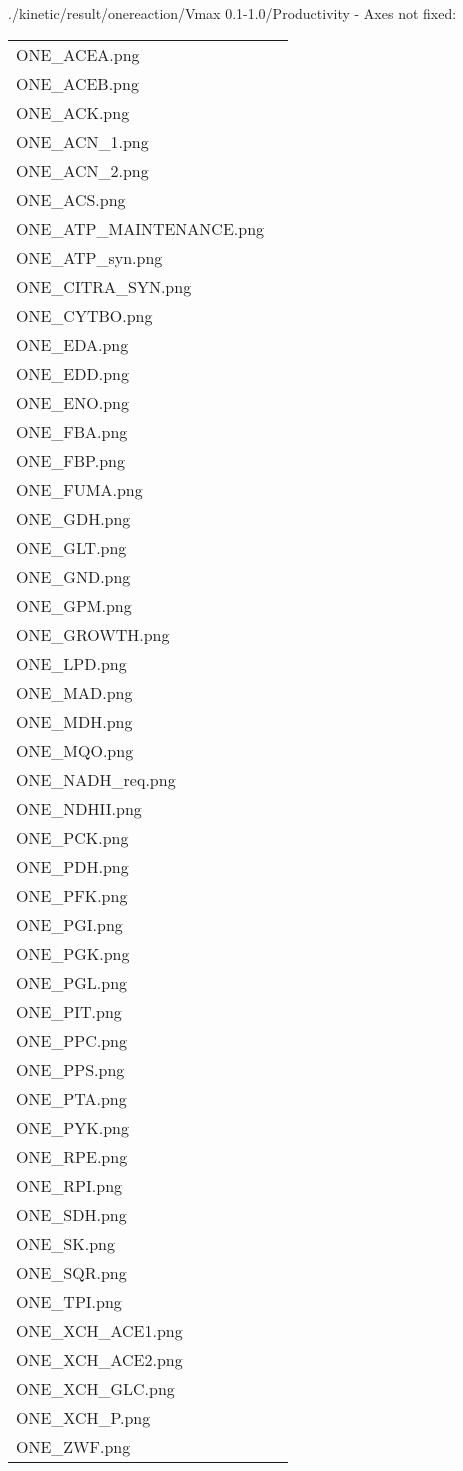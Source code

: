 \documentclass[a4paper, parskip=full]{scrreprt}
\begin{document}
./kinetic/result/onereaction/Vmax 0.1-1.0/Productivity - Axes not fixed:

\begin{longtable}{ll}
ONE\_ACEA.png\\
ONE\_ACEB.png\\
ONE\_ACK.png\\
ONE\_ACN\_1.png\\
ONE\_ACN\_2.png\\
ONE\_ACS.png\\
ONE\_ATP\_MAINTENANCE.png\\
ONE\_ATP\_syn.png\\
ONE\_CITRA\_SYN.png\\
ONE\_CYTBO.png\\
ONE\_EDA.png\\
ONE\_EDD.png\\
ONE\_ENO.png\\
ONE\_FBA.png\\
ONE\_FBP.png\\
ONE\_FUMA.png\\
ONE\_GDH.png\\
ONE\_GLT.png\\
ONE\_GND.png\\
ONE\_GPM.png\\
ONE\_GROWTH.png\\
ONE\_LPD.png\\
ONE\_MAD.png\\
ONE\_MDH.png\\
ONE\_MQO.png\\
ONE\_NADH\_req.png\\
ONE\_NDHII.png\\
ONE\_PCK.png\\
ONE\_PDH.png\\
ONE\_PFK.png\\
ONE\_PGI.png\\
ONE\_PGK.png\\
ONE\_PGL.png\\
ONE\_PIT.png\\
ONE\_PPC.png\\
ONE\_PPS.png\\
ONE\_PTA.png\\
ONE\_PYK.png\\
ONE\_RPE.png\\
ONE\_RPI.png\\
ONE\_SDH.png\\
ONE\_SK.png\\
ONE\_SQR.png\\
ONE\_TPI.png\\
ONE\_XCH\_ACE1.png\\
ONE\_XCH\_ACE2.png\\
ONE\_XCH\_GLC.png\\
ONE\_XCH\_P.png\\
ONE\_ZWF.png
\end{longtable}
\end{document}
